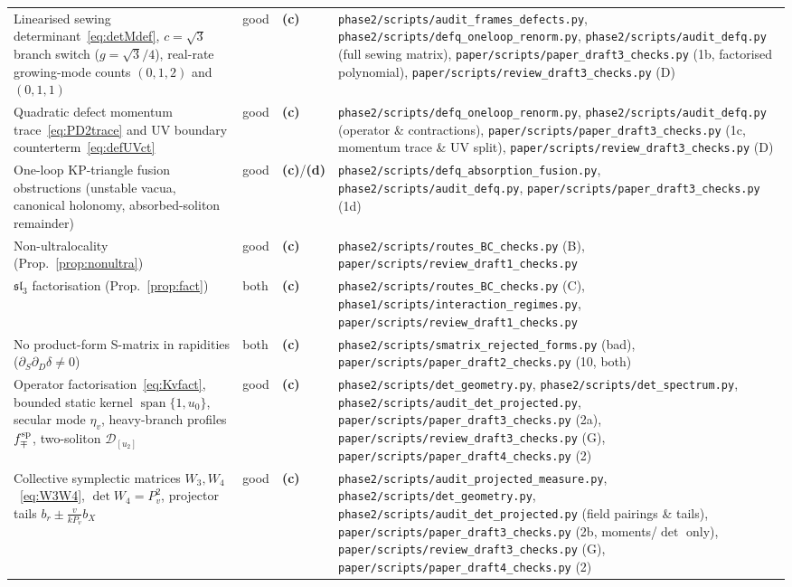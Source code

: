 \documentclass[11pt,a4paper]{article}
\newcommand{\lab}[1]{{\normalfont\sffamily\footnotesize\bfseries(#1)}}
\newcommand{\Lc}{\lab{c}}
\newcommand{\Ld}{\lab{d}}
\newcommand{\scr}[1]{\nolinkurl{#1}}
\theoremstyle{remark}
\begin{document}
\begin{longtable}{@{}>{\raggedright}p{5.4cm}>{\raggedright}p{1.3cm}>{\raggedright}p{0.75cm}>{\raggedright\arraybackslash}p{6.55cm}@{}}
Linearised sewing determinant~\eqref{eq:detMdef}, $c=\sqrt3$ branch switch ($g=\sqrt3/4$), real-rate growing-mode counts $(0,1,2)$ and $(0,1,1)$ & good & \Lc & \scr{phase2/scripts/audit_frames_defects.py}, \scr{phase2/scripts/defq_oneloop_renorm.py}, \scr{phase2/scripts/audit_defq.py} (full sewing matrix), \scr{paper/scripts/paper_draft3_checks.py} (1b, factorised polynomial), \nolinkurl{paper/scripts/review_draft3_checks.py} (D)\\
Quadratic defect momentum trace~\eqref{eq:PD2trace} and UV boundary counterterm~\eqref{eq:defUVct} & good & \Lc & \scr{phase2/scripts/defq_oneloop_renorm.py}, \scr{phase2/scripts/audit_defq.py} (operator \& contractions), \scr{paper/scripts/paper_draft3_checks.py} (1c, momentum trace \& UV split), \nolinkurl{paper/scripts/review_draft3_checks.py} (D)\\
One-loop KP-triangle fusion obstructions (unstable vacua, canonical holonomy, absorbed-soliton remainder) & good & \Lc/\Ld & \scr{phase2/scripts/defq_absorption_fusion.py}, \scr{phase2/scripts/audit_defq.py}, \scr{paper/scripts/paper_draft3_checks.py} (1d)\\
Non-ultralocality (Prop.~\ref{prop:nonultra}) & good & \Lc & \scr{phase2/scripts/routes_BC_checks.py} (B), \scr{paper/scripts/review_draft1_checks.py}\\
$\mathfrak{sl}_3$ factorisation (Prop.~\ref{prop:fact}) & both & \Lc & \scr{phase2/scripts/routes_BC_checks.py} (C), \scr{phase1/scripts/interaction_regimes.py}, \scr{paper/scripts/review_draft1_checks.py}\\
No product-form S-matrix in rapidities ($\partial_S\partial_D\delta\neq0$) & both & \Lc & \scr{phase2/scripts/smatrix_rejected_forms.py} (bad), \scr{paper/scripts/paper_draft2_checks.py} (10, both)\\
Operator factorisation~\eqref{eq:Kvfact}, bounded static kernel $\operatorname{span}\{1,u_0\}$, secular mode $\eta_v$, heavy-branch profiles $f_\mp^{\rm sp}$, two-soliton $\mathcal D_{[u_2]}$ & good & \Lc & \scr{phase2/scripts/det_geometry.py}, \scr{phase2/scripts/det_spectrum.py}, \scr{phase2/scripts/audit_det_projected.py}, \scr{paper/scripts/paper_draft3_checks.py} (2a), \nolinkurl{paper/scripts/review_draft3_checks.py} (G), \nolinkurl{paper/scripts/paper_draft4_checks.py} (2)\\
Collective symplectic matrices $W_3,W_4$~\eqref{eq:W3W4}, $\det W_4=P_v^2$, projector tails $b_r\pm\frac{v}{kP_v}b_X$ & good & \Lc & \scr{phase2/scripts/audit_projected_measure.py}, \scr{phase2/scripts/det_geometry.py}, \scr{phase2/scripts/audit_det_projected.py} (field pairings \& tails), \scr{paper/scripts/paper_draft3_checks.py} (2b, moments/$\det$ only), \nolinkurl{paper/scripts/review_draft3_checks.py} (G), \nolinkurl{paper/scripts/paper_draft4_checks.py} (2)\\

\end{longtable}
\end{document}
